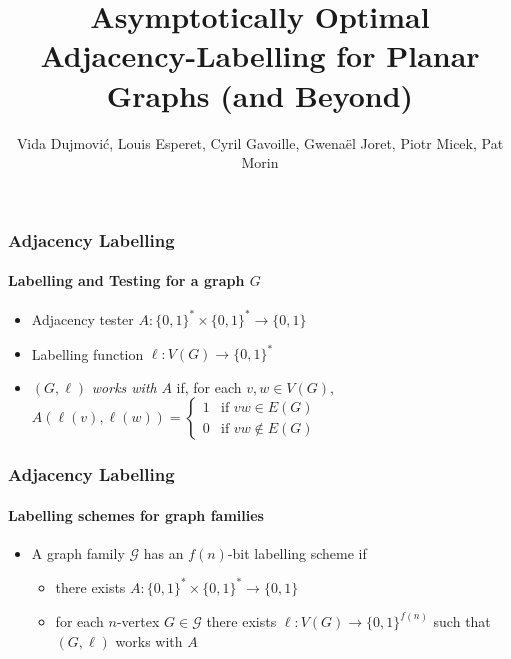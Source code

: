 \documentclass[xcolor=dvipsnames]{beamer}
\title[Adjacency Labelling]{Asymptotically Optimal Adjacency-Labelling
    \newline for Planar Graphs
 (and Beyond)}
\author[Dujmović \textit{et al}]{Vida Dujmović, Louis Esperet, Cyril Gavoille,
    \newline Gwenaël Joret, Piotr Micek, Pat Morin}
\begin{document}
\begin{frame}
  \titlepage
\end{frame}

\begin{frame}
  \frametitle{Adjacency Labelling}
  \framesubtitle{Labelling and Testing for a graph $G$}

  \begin{itemize}
    \item Adjacency tester $A:\{0,1\}^*\times\{0,1\}^*\to \{0,1\}$
    \item Labelling function $\ell:V(G)\to\{0,1\}^*$
    \item $(G,\ell)$ \emph{works with} $A$ if, for each $v,w\in V(G)$,
        $
            A(\ell(v),\ell(w)) = \begin{cases}
                1 & \text{if $vw\in E(G)$} \\
                0 & \text{if $vw\not\in E(G)$}
        \end{cases}
        $
    \end{itemize}
    \begin{center}
    \end{center}
\end{frame}

\begin{frame}
    \frametitle{Adjacency Labelling}
    \framesubtitle{Labelling schemes for graph families}

    \begin{itemize}
        \item<+->A graph family $\mathcal{G}$ has an $f(n)$-bit labelling scheme if \begin{itemize}
            \item there exists $A:\{0,1\}^*\times\{0,1\}^*\to\{0,1\}$
            \item for each $n$-vertex $G\in\mathcal{G}$ there exists $\ell:V(G)\to\{0,1\}^{f(n)}$ such that $(G,\ell)$ works with $A$
        \end{itemize}
    \end{itemize}
    \begin{center}
    \end{center}
\end{frame}
\end{document}
